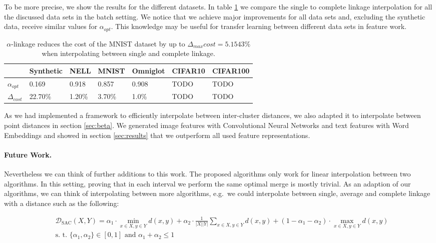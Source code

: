 To be more precise, we show the results for the different datasets. In table \ref{table:comparison} we compare the single to complete linkage interpolation for all the discussed data sets in the batch setting. We notice that we achieve major improvements for all data sets and, excluding the synthetic data, receive similar values for $\alpha_{opt}$. This knowledge may be useful for transfer learning between different data sets in feature work.

\begin{table}[H]
    \centering
    \begin{tabular}{|l | l l l l l l |}
    \hline
    & Synthetic & NELL & MNIST & Omniglot & CIFAR10 & CIFAR100\\ \hline
    $\alpha_{opt}$ & 0.169 & 0.918 & 0.857 & 0.908 & TODO & TODO\\
    $\Delta_{cost}$ & 22.70\% & 1.20\% & 3.70\% & 1.0\% & TODO & TODO\\\hline
    \end{tabular}
    \caption{$\alpha$-linkage reduces the cost of the MNIST dataset by up to $\Delta_{max} cost = 5.1543\%$ when interpolating between single and complete linkage.}
    \label{table:comparison}
\end{table}

As we had implemented a framework to efficiently interpolate between inter-cluster distances, we also adapted it to interpolate between point distances in section \ref{sec:beta}. We generated image features with Convolutional Neural Networks and text features with Word Embeddings and showed in section \ref{sec:results} that we outperform all used feature representations.

\paragraph{Future Work.} Nevertheless we can think of further additions to this work. The proposed algorithms only work for linear interpolation between two algorithms. In this setting, proving that in each interval we perform the same optimal merge is mostly trivial. As an adaption of our algorithms, we can think of interpolating between more algorithms, e.g.\ we could interpolate between single, average and complete linkage with a distance such as the following:

\begin{align*}
&\mathcal{D}_\text{SAC}(X,Y) = \alpha_1 \cdot \min\limits_{x \in X, y \in Y} d(x,y) + \alpha_2 \cdot \frac{1}{|X||Y|} \sum\limits_{x \in X, y \in Y} d(x,y) + (1-\alpha_1-\alpha_2) \cdot \max\limits_{x \in X, y \in Y} d(x,y)\\
&\text{s. t. } \{\alpha_1, \alpha_2\} \in [0,1] \text{ and } \alpha_1 + \alpha_2 \le 1
\end{align*}

